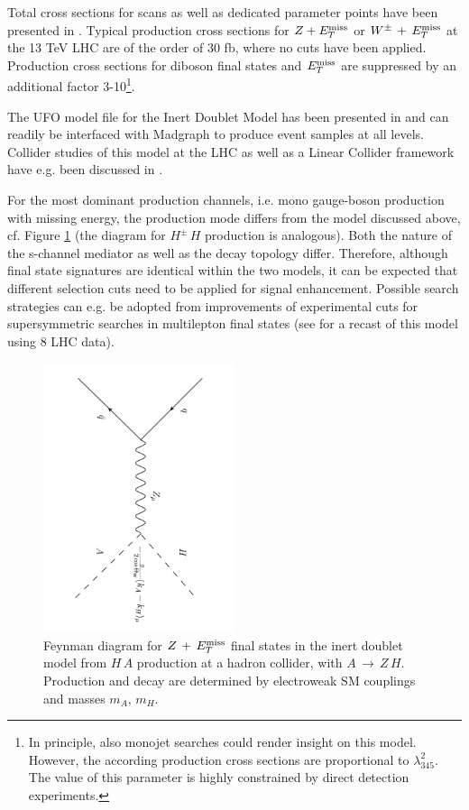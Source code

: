 Total cross sections for scans as well as dedicated parameter points have been presented in \cite{Ilnicka:2015jba,deFlorian:2016spz,Belyaev:2016lok}. Typical production cross sections for $Z+E_T^\mathrm{miss}$ or $W^\pm\,+\,E_T^\mathrm{miss}$ at the 13 TeV LHC are of the order of 30 fb, where no cuts have been applied. Production cross sections for diboson final states and $E_T^\mathrm{miss}$ are suppressed by an additional factor 3-10\footnote{In principle, also monojet searches could render insight on this model. However, the according production cross sections are proportional to $\lambda_{345}^2$. The value of this parameter is highly constrained by direct detection experiments.}.

The UFO model file for the Inert Doublet Model has been presented in \cite{Goudelis:2013uca} and can readily be interfaced with Madgraph to produce event samples at all levels. Collider studies of this model at the LHC as well as a Linear Collider framework have e.g. been discussed in \cite{Gustafsson:2012aj,Arhrib:2013ela,Hashemi:2015swh,Poulose:2016lvz,Datta:2016nfz,Hashemi:2016wup}.

For the most dominant production channels, i.e. mono gauge-boson production with missing energy, the production mode differs from the model discussed above, cf. Figure \ref{fig:haprod} (the diagram for $H^\pm\,H$ production is analogous). Both the nature of the s-channel mediator as well as the decay topology differ. Therefore, although final state signatures are identical within the two models, it can be expected that different selection cuts need to be applied for signal enhancement. Possible search strategies can e.g. be adopted from improvements of experimental cuts for supersymmetric searches in multilepton final states (see \cite{Belanger:2015kga} for a recast of this model using 8 \TeV LHC data).
\begin{figure}
\centering
\includegraphics[angle=90,width=0.5\textwidth]{texinputs_app/IDM/ppHA.pdf}
\caption{\label{fig:haprod} Feynman diagram for $Z\,+\,E_T^\mathrm{miss}$ final states in the inert doublet model from $H\,A$ production at a hadron collider, with $A\,\rightarrow\,Z\,H$. Production and decay are determined by electroweak SM couplings and masses $m_A,\,m_H$.} 
\end{figure}
